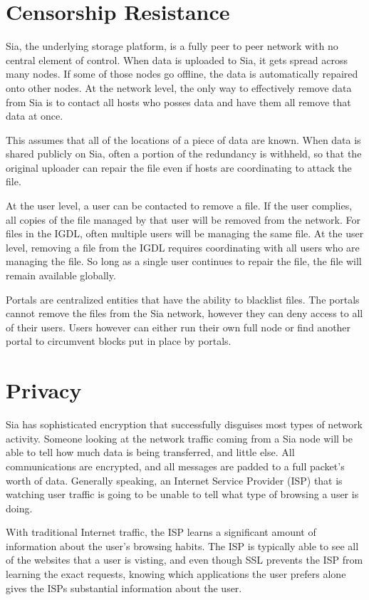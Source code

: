 \documentclass[twocolumn]{article}
\begin{document}
\section{Censorship Resistance}
Sia, the underlying storage platform, is a fully peer to peer network with no
central element of control. When data is uploaded to Sia, it gets spread across
many nodes. If some of those nodes go offline, the data is automatically
repaired onto other nodes. At the network level, the only way to effectively
remove data from Sia is to contact all hosts who posses data and have them all
remove that data at once.

This assumes that all of the locations of a piece of data are known. When data
is shared publicly on Sia, often a portion of the redundancy is withheld, so
that the original uploader can repair the file even if hosts are coordinating to
attack the file.

At the user level, a user can be contacted to remove a file. If the user
complies, all copies of the file managed by that user will be removed from the
network. For files in the IGDL, often multiple users will be managing the same
file. At the user level, removing a file from the IGDL requires coordinating
with all users who are managing the file. So long as a single user continues to
repair the file, the file will remain available globally.

Portals are centralized entities that have the ability to blacklist files. The
portals cannot remove the files from the Sia network, however they can deny
access to all of their users. Users however can either run their own full node
or find another portal to circumvent blocks put in place by portals.

\section{Privacy}
Sia has sophisticated encryption that successfully disguises most types of
network activity. Someone looking at the network traffic coming from a Sia node
will be able to tell how much data is being transferred, and little else. All
communications are encrypted, and all messages are padded to a full packet's
worth of data. Generally speaking, an Internet Service Provider (ISP) that is
watching user traffic is going to be unable to tell what type of browsing a user
is doing.

With traditional Internet traffic, the ISP learns a significant amount of
information about the user's browsing habits. The ISP is typically able to see
all of the websites that a user is visting, and even though SSL prevents the ISP
from learning the exact requests, knowing which applications the user prefers
alone gives the ISPs substantial information about the user.
\end{document}
